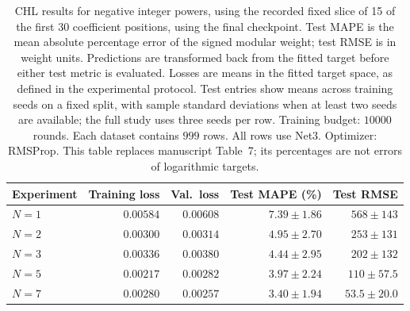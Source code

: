 \begin{table}[!htbp]
\centering
\small
\setlength{\tabcolsep}{4pt}
\renewcommand{\arraystretch}{1.18}
\begin{tabular}{@{}lrrrr@{}}
\toprule
Experiment & Training loss & Val.\ loss & Test MAPE (\%) & Test RMSE \\
\midrule
$N=1$ & $0.00584$ & $0.00608$ & $7.39\pm1.86$ & $568\pm143$ \\
$N=2$ & $0.00300$ & $0.00314$ & $4.95\pm2.70$ & $253\pm131$ \\
$N=3$ & $0.00336$ & $0.00380$ & $4.44\pm2.95$ & $202\pm132$ \\
$N=5$ & $0.00217$ & $0.00282$ & $3.97\pm2.24$ & $110\pm57.5$ \\
$N=7$ & $0.00280$ & $0.00257$ & $3.40\pm1.94$ & $53.5\pm20.0$ \\
\bottomrule
\end{tabular}
\caption{\textsf{CHL results for negative integer powers, using the recorded fixed slice of 15 of the first 30 coefficient positions, using the final checkpoint. Test MAPE is the mean absolute percentage error of the signed modular weight; test RMSE is in weight units. Predictions are transformed back from the fitted target before either test metric is evaluated. Losses are means in the fitted target space, as defined in the experimental protocol. Test entries show means across training seeds on a fixed split, with sample standard deviations when at least two seeds are available; the full study uses three seeds per row. Training budget: $10000$ rounds. Each dataset contains $999$ rows. All rows use Net3. Optimizer: RMSProp. This table replaces manuscript Table~7; its percentages are not errors of logarithmic targets.}}
\label{tab:chl-revised-7-final}
\end{table}

